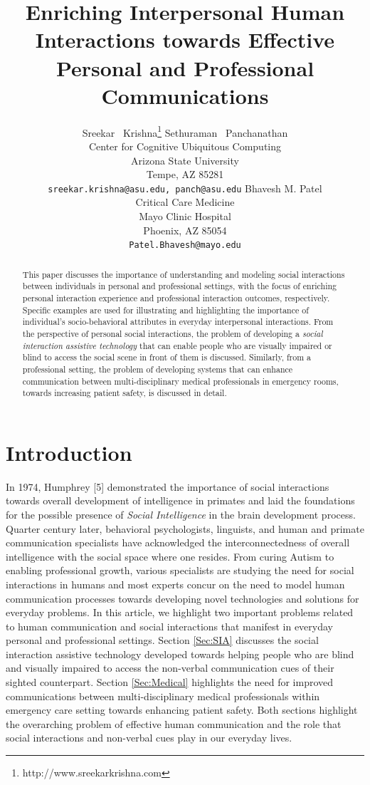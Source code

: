 \documentclass{article} %
\title{Enriching Interpersonal Human Interactions towards Effective Personal and Professional Communications}
\author{
Sreekar ~Krishna\thanks{http://www.sreekarkrishna.com} \hspace{0.1in} Sethuraman ~Panchanathan \\
Center for Cognitive Ubiquitous Computing\\
Arizona State University\\
Tempe, AZ 85281 \\
\texttt{sreekar.krishna@asu.edu, panch@asu.edu}
\And 
Bhavesh M. Patel \\
Critical Care Medicine \\
Mayo Clinic Hospital \\
Phoenix, AZ 85054\\
\texttt{Patel.Bhavesh@mayo.edu}
\And
}
\begin{document}
\maketitle

\vspace{-0.2in}

\begin{abstract}
\vspace{-0.1in}
This paper discusses the importance of understanding and modeling social interactions between individuals in personal and professional settings, with the focus of enriching personal interaction experience and professional interaction outcomes, respectively. Specific examples are used for illustrating and highlighting the importance of individual's socio-behavioral attributes in everyday interpersonal interactions. From the perspective of personal social interactions, the problem of developing a \emph {social interaction assistive technology} that can enable people who are visually impaired or blind to access the social scene in front of them is discussed. Similarly, from a professional setting, the problem of developing systems that can enhance communication between multi-disciplinary medical professionals in emergency rooms, towards increasing patient safety, is discussed in detail.
\end{abstract}

\vspace{-0.2in}
\section{Introduction}
\vspace{-0.13in}
In 1974, Humphrey [5] demonstrated the importance of social interactions towards overall development of intelligence  in primates and laid the foundations for the possible presence of \emph{Social Intelligence} in the brain development process. Quarter century later, behavioral psychologists, linguists, and human and primate communication specialists have  acknowledged the interconnectedness of overall intelligence with the social space where one resides. From curing Autism to enabling professional growth, various specialists are studying the need for social interactions in humans and most experts concur on the need to model human communication processes towards developing novel technologies and solutions for everyday problems. In this article, we highlight two important problems related to human communication and social interactions that manifest in everyday personal and professional settings. Section \ref{Sec:SIA} discusses the social interaction assistive technology developed towards helping people who are blind and visually impaired to access the non-verbal communication cues of their sighted counterpart. Section \ref{Sec:Medical} highlights the need for improved communications between multi-disciplinary medical professionals within emergency care setting towards enhancing patient safety. Both sections highlight the overarching problem of effective human communication and the role that social interactions and non-verbal cues play in our everyday lives.  
\end{document}

